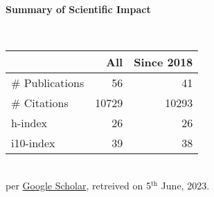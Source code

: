 \headedsection %
{\bf Summary of Scientific Impact}{}{}
{
    \qquad~~~~
    \begin{minipage}[t]{0.6\textwidth}
        \begin{tabular}{lrr}
        \hline
         & All & Since 2018\\
        \hline
        \# Publications & 56     & 41    \\
        \# Citations    & 10729  & 10293  \\
        h-index         & 26     & 26    \\
        i10-index       & 39     & 38    \\
        \hline
    \end{tabular}
    \\
    {\footnotesize{
        per \href{https://scholar.google.com/citations?user=wpLQuroAAAAJ}{Google Scholar},
        retreived on 5$^\text{th}$ June, 2023.
        }
    }
    \end{minipage}

}

